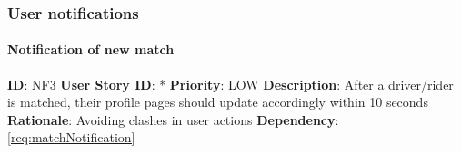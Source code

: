 \documentclass{article}
\begin{document}
\subsubsection{User notifications}

\paragraph{Notification of new match}\label{req:}
\textbf{ID}: NF3\newline
\textbf{User Story ID}: *\newline
\textbf{Priority}: LOW\newline
\textbf{Description}: After a driver/rider is matched, their profile pages should update accordingly within 10 seconds\newline
\textbf{Rationale}: Avoiding clashes in user actions\newline
\textbf{Dependency}: \ref{req:matchNotification} \newline



\newpage
\end{document}
